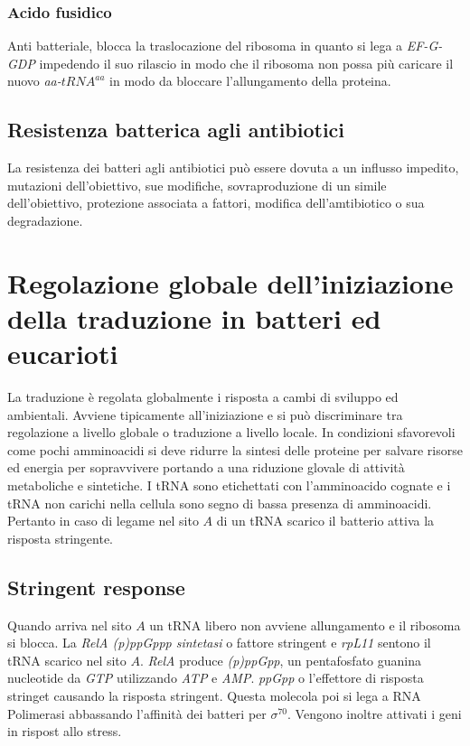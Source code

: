 \subsubsection{Acido fusidico}
Anti batteriale, blocca la traslocazione del ribosoma in quanto si lega a \emph{EF-G-GDP} impedendo il suo rilascio in modo che il ribosoma non possa pi\`u caricare il nuovo
\emph{aa-$tRNA^{aa}$} in modo da bloccare l'allungamento della proteina. 
\subsection{Resistenza batterica agli antibiotici}
La resistenza dei batteri agli antibiotici pu\`o essere dovuta a un influsso impedito, mutazioni dell'obiettivo, sue modifiche, sovraproduzione di un simile dell'obiettivo, protezione
associata a fattori, modifica dell'amtibiotico o sua degradazione. 
\section{Regolazione globale dell'iniziazione della traduzione in batteri ed eucarioti}
La traduzione \`e regolata globalmente i risposta a cambi di sviluppo ed ambientali. Avviene tipicamente all'iniziazione e si pu\`o discriminare tra regolazione a livello globale o 
traduzione a livello locale. In condizioni sfavorevoli come pochi amminoacidi si deve ridurre la sintesi delle proteine per salvare risorse ed energia per sopravvivere portando
a una riduzione glovale di attivit\`a metaboliche e sintetiche. I tRNA sono etichettati con l'amminoacido cognate e i tRNA non carichi nella cellula sono segno di bassa presenza di 
amminoacidi. Pertanto in caso di legame nel sito $A$ di un tRNA scarico il batterio attiva la risposta stringente. 
\subsection{Stringent response}
Quando arriva nel sito $A$ un tRNA libero non avviene allungamento e il ribosoma si blocca. La \emph{RelA (p)ppGppp sintetasi} o fattore stringent e \emph{rpL11} sentono il 
tRNA scarico nel sito $A$. \emph{RelA} produce \emph{(p)ppGpp}, un pentafosfato guanina nucleotide da \emph{GTP} utilizzando \emph{ATP} e \emph{AMP}. \emph{ppGpp} o l'effettore di 
risposta stringet causando la risposta stringent. Questa molecola poi si lega a RNA Polimerasi abbassando l'affinit\`a dei batteri per $\sigma^{70}$. Vengono inoltre attivati i 
geni in rispost allo stress. 

